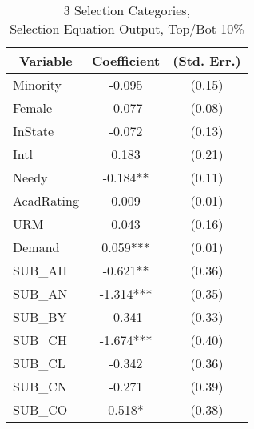\clearpage{}

\newpage{}

\begin{table}[H]\centering
  \begin{threeparttable}
    \caption{3 Selection Categories, \\Selection Equation Output, Top/Bot 10\%}\label{table:b6}
    \begin{tabular}{l c c}
      \hline\hline 
      \multicolumn{1}{c}{\textbf{Variable}} & {\textbf{Coefficient}} & \textbf{(Std. Err.)} \\ 
      \hline
      \hline 
      Minority                              & -0.095                 & (0.15)               \\
      Female                                & -0.077                 & (0.08)               \\
      InState                                    & -0.072                 & (0.13)               \\
      Intl                                  & 0.183                  & (0.21)               \\
      Needy                                 & -0.184**               & (0.11)               \\
      AcadRating                            & 0.009                  & (0.01)               \\
      URM                                   & 0.043                  & (0.16)               \\
      Demand                                & 0.059***               & (0.01)               \\
      SUB\_AH                               & -0.621**               & (0.36)               \\
      SUB\_AN                               & -1.314***              & (0.35)               \\
      SUB\_BY                               & -0.341                 & (0.33)               \\
      SUB\_CH                               & -1.674***              & (0.40)               \\
      SUB\_CL                               & -0.342                 & (0.36)               \\
      SUB\_CN                               & -0.271                 & (0.39)               \\
      SUB\_CO                               & 0.518*                 & (0.38)               \\

\end{tabular}
\end{threeparttable}
\end{table}
